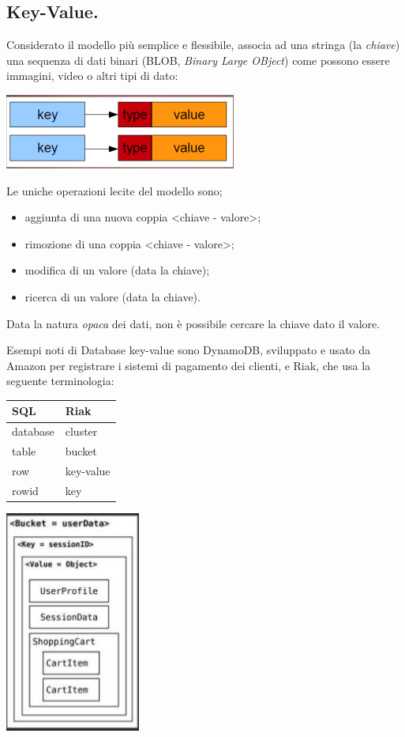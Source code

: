 \documentclass[a4page, 11pt]{article}
\begin{document}
\subsection{Key-Value.}
Considerato il modello più semplice e flessibile, associa ad una stringa (la \textit{chiave}) una sequenza di dati binari (BLOB, \textit{Binary Large OBject}) come possono essere immagini, video o altri tipi di dato:
\begin{center}
  \includegraphics[scale=0.5]{IMAGE3.jpg}
\end{center}
Le uniche operazioni lecite del modello sono;
\begin{itemize}
\item aggiunta di una nuova coppia \textless{}chiave - valore\textgreater{};
\item rimozione di una coppia \textless{}chiave - valore\textgreater{};
\item modifica di un valore (data la chiave);
\item ricerca di un valore (data la chiave).
\end{itemize}
Data la natura \textit{opaca} dei dati, non è possibile cercare la chiave dato il valore.

Esempi noti di Database key-value sono DynamoDB, sviluppato e usato da Amazon per registrare i sistemi di pagamento dei clienti, e Riak, che usa la seguente terminologia:
\begin{center}
  \begin{minipage}[b]{0.4\textwidth}
    \begin{tabular}{|l|l|}
      \hline
      \textbf{SQL} & \textbf{Riak}\\ \hline
      database & cluster \\ \hline
      table & bucket \\ \hline
      row & key-value\\ \hline
      rowid & key\\ \hline
    \end{tabular}
  \end{minipage}
  \begin{minipage}{.5\textwidth}\centering
    \includegraphics[scale=0.6]{IMAGE4.jpg}
  \end{minipage}
\end{center}
\end{document}
